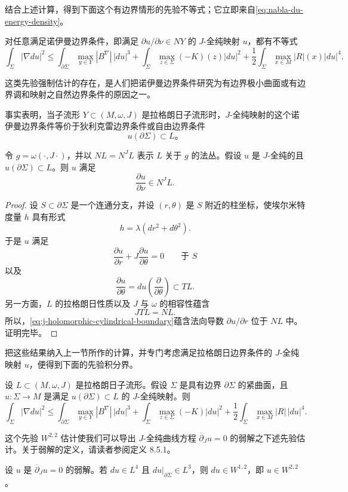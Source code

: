 结合上述计算，得到下面这个有边界情形的先验不等式；它立即来自\eqref{eq:nabla-du-energy-density}。

\begin{proposition}\label{prop:neumann-j-holomorphic-integral-bound}
对任意满足诺伊曼边界条件，即满足
$\partial u/\partial\nu\in NY$ 的 $J$-全纯映射 $u$，都有不等式
\begin{equation}
 \int_\Sigma|\nabla du|^2
 \leq\int_{\partial\Sigma}\max_{y\in Y}|B^\nabla|\,|du|^3
 +\int_\Sigma\max_{z\in\Sigma}(-K)(z)|du|^2
 +\frac12\int_\Sigma\max_{x\in M}|R|(x)|du|^4.
 \label{eq:neumann-j-holomorphic-integral-bound}
\end{equation}
\end{proposition}

这类先验强制估计的存在，是人们把诺伊曼边界条件研究为有边界极小曲面或有边界调和映射之自然边界条件的原因之一。

事实表明，当子流形 $Y\subset(M,\omega,J)$ 是拉格朗日子流形时，$J$-全纯映射的这个诺伊曼边界条件等价于狄利克雷边界条件或自由边界条件
\[
 u(\partial\Sigma)\subset L\text{。}
\]

\begin{lemma}\label{lem:lagrangian-boundary-neumann-condition}
令 $g=\omega(\cdot,J\cdot)$，并以 $NL=N^JL$ 表示 $L$ 关于 $g$ 的法丛。假设 $u$ 是 $J$-全纯的且 $u(\partial\Sigma)\subset L$。则 $u$ 满足
\[
 \frac{\partial u}{\partial\nu}\in N^JL.
\]
\end{lemma}

\begin{proof}
设 $S\subset\partial\Sigma$ 是一个连通分支，并设 $(r,\theta)$ 是 $S$ 附近的柱坐标，使埃尔米特度量 $h$ 具有形式
\[
 h=\lambda(dr^2+d\theta^2).
\]
于是 $u$ 满足
\begin{equation}
 \frac{\partial u}{\partial r}
 +J\frac{\partial u}{\partial\theta}=0
 \qquad\text{于 }S
 \label{eq:j-holomorphic-cylindrical-boundary}
\end{equation}
以及
\[
 \frac{\partial u}{\partial\theta}
 =du\left(\frac\partial{\partial\theta}\right)\subset TL.
\]
另一方面，$L$ 的拉格朗日性质以及 $J$ 与 $\omega$ 的相容性蕴含
\[
 JTL=NL.
\]
所以，\eqref{eq:j-holomorphic-cylindrical-boundary}蕴含法向导数
$\partial u/\partial r$ 位于 $NL$ 中。证明完毕。
\end{proof}

把这些结果纳入上一节所作的计算，并专门考虑满足拉格朗日边界条件的 $J$-全纯映射 $u$，便得到下面的先验积分界。

\begin{proposition}\label{prop:lagrangian-boundary-w22-estimate}
设 $L\subset(M,\omega,J)$ 是拉格朗日子流形。假设 $\Sigma$ 是具有边界 $\partial\Sigma$ 的紧曲面，且 $u:\Sigma\to M$ 是满足
$u(\partial\Sigma)\subset L$ 的 $J$-全纯映射。则
\[
 \int_\Sigma|\nabla du|^2
 \leq\int_{\partial\Sigma}\max_{y\in Y}|B^\nabla|\,|du|^3
 +\int_\Sigma\max_{z\in\Sigma}(-K)|du|^2
 +\frac12\int_\Sigma\max_{x\in M}|R|\,|du|^4.
\]
\end{proposition}

这个先验 $W^{2,2}$ 估计使我们可以导出 $J$-全纯曲线方程
$\overline\partial_Ju=0$ 的弱解之下述先验估计。关于弱解的定义，请读者参阅定义 8.5.1。

\begin{corollary}\label{cor:weak-j-holomorphic-w22-regularity}
设 $u$ 是 $\overline\partial_Ju=0$ 的弱解。若 $du\in L^4$ 且
$du|_{\partial\Sigma}\in L^3$，则 $du\in W^{1,2}$，即 $u\in W^{2,2}$。
\end{corollary}
